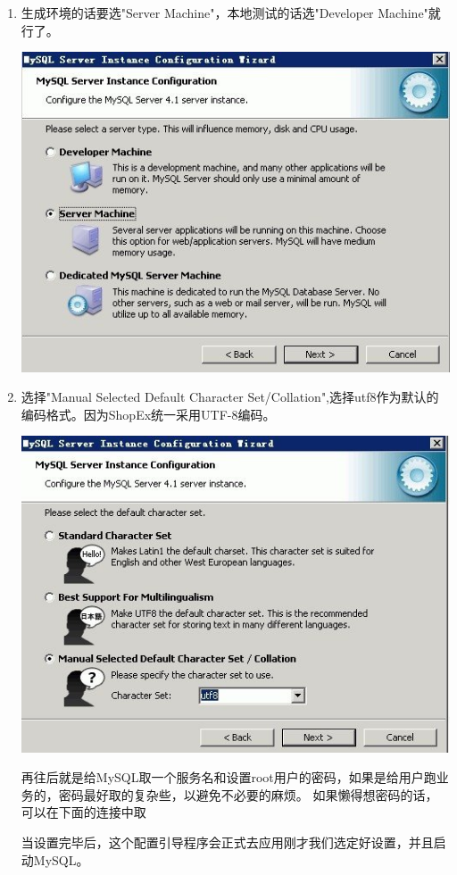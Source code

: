 \documentclass{article}
\begin{document}
\begin{enumerate}
\item 生成环境的话要选"Server Machine"，本地测试的话选"Developer Machine"就行了。

\includegraphics{img/install/windows/mysql/12.jpg}

\item 选择"Manual Selected Default Character Set/Collation",选择utf8作为默认的编码格式。因为ShopEx统一采用UTF-8编码。

\includegraphics{img/install/windows/mysql/13.jpg}

再往后就是给MySQL取一个服务名和设置root用户的密码，如果是给用户跑业务的，密码最好取的复杂些，以避免不必要的麻烦。
如果懒得想密码的话，可以在下面的连接中取


当设置完毕后，这个配置引导程序会正式去应用刚才我们选定好设置，并且启动MySQL。
\end{enumerate}
\end{document}
